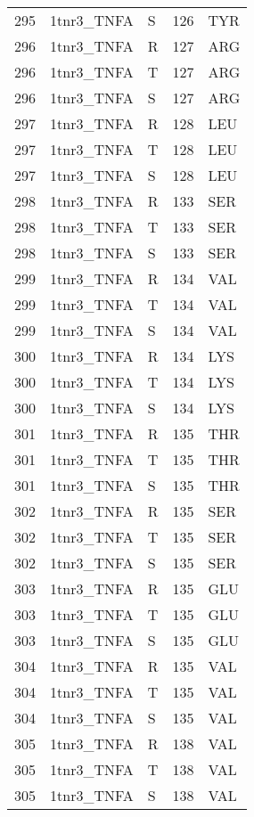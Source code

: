 \begin{tiny}
\begin{longtable}[l]{l|l|l|l|l}
	295 & 1tnr3\_TNFA & S & 126 & TYR \\
	296 & 1tnr3\_TNFA & R & 127 & ARG \\
	296 & 1tnr3\_TNFA & T & 127 & ARG \\
	296 & 1tnr3\_TNFA & S & 127 & ARG \\
	297 & 1tnr3\_TNFA & R & 128 & LEU \\
	297 & 1tnr3\_TNFA & T & 128 & LEU \\
	297 & 1tnr3\_TNFA & S & 128 & LEU \\
	298 & 1tnr3\_TNFA & R & 133 & SER \\
	298 & 1tnr3\_TNFA & T & 133 & SER \\
	298 & 1tnr3\_TNFA & S & 133 & SER \\
	299 & 1tnr3\_TNFA & R & 134 & VAL \\
	299 & 1tnr3\_TNFA & T & 134 & VAL \\
	299 & 1tnr3\_TNFA & S & 134 & VAL \\
	300 & 1tnr3\_TNFA & R & 134 & LYS \\
	300 & 1tnr3\_TNFA & T & 134 & LYS \\
	300 & 1tnr3\_TNFA & S & 134 & LYS \\
	301 & 1tnr3\_TNFA & R & 135 & THR \\
	301 & 1tnr3\_TNFA & T & 135 & THR \\
	301 & 1tnr3\_TNFA & S & 135 & THR \\
	302 & 1tnr3\_TNFA & R & 135 & SER \\
	302 & 1tnr3\_TNFA & T & 135 & SER \\
	302 & 1tnr3\_TNFA & S & 135 & SER \\
	303 & 1tnr3\_TNFA & R & 135 & GLU \\
	303 & 1tnr3\_TNFA & T & 135 & GLU \\
	303 & 1tnr3\_TNFA & S & 135 & GLU \\
	304 & 1tnr3\_TNFA & R & 135 & VAL \\
	304 & 1tnr3\_TNFA & T & 135 & VAL \\
	304 & 1tnr3\_TNFA & S & 135 & VAL \\
	305 & 1tnr3\_TNFA & R & 138 & VAL \\
	305 & 1tnr3\_TNFA & T & 138 & VAL \\
	305 & 1tnr3\_TNFA & S & 138 & VAL \\
\end{longtable}
\end{tiny}